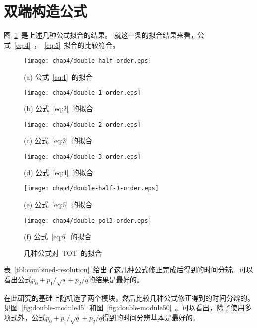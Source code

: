 \section{双端构造公式}

图~\ref{fig:single-formula}~是上述几种公式拟合的结果。
就这一条的拟合结果来看，公式~\ref{eq:4}~，~\ref{eq:5}~拟合的比较符合。

\begin{figure}[!h]
\begin{minipage}{0.5\linewidth}
  \centerline{\texttt{[image: chap4/double-half-order.eps]}}
  \centerline{(a) 公式~\ref{eq:1}~的拟合}
  \centerline{\label{fig:double-half-order}}
\end{minipage}
\hfill
\begin{minipage}{0.5\linewidth}
  \centerline{\texttt{[image: chap4/double-1-order.eps]}}
  \centerline{(b) 公式~\ref{eq:2}~的拟合}
  \centerline{\label{fig:double-1-order}}
\end{minipage}
\vfill
\begin{minipage}{0.5\linewidth}
  \centerline{\texttt{[image: chap4/double-2-order.eps]}}
  \centerline{(c) 公式~\ref{eq:3}~的拟合}
  \centerline{\label{fig:double-2-order}}
\end{minipage}
\hfill
\begin{minipage}{0.5\linewidth}
  \centerline{\texttt{[image: chap4/double-3-order.eps]}}
  \centerline{(d) 公式~\ref{eq:4}~的拟合}
  \centerline{\label{fig:double-3-order}}
\end{minipage}
\vfill
\begin{minipage}{0.5\linewidth}
  \centerline{\texttt{[image: chap4/double-half-1-order.eps]}}
  \centerline{(e) 公式~\ref{eq:5}~的拟合}
  \centerline{\label{fig:double-half-1-order}}
\end{minipage}
\hfill
\begin{minipage}{0.5\linewidth}
  \centerline{\texttt{[image: chap4/double-pol3-order.eps]}}
  \centerline{(f) 公式~\ref{eq:6}~的拟合}
  \centerline{\label{fig:double-pol3-order}}
\end{minipage}
\caption{几种公式对~TOT~的拟合}
\label{fig:single-formula}
\end{figure}

表~\ref{tbl:combined-resolution}~给出了这几种公式修正完成后得到的时间分辨。可以看出公式${p_{0}+p_{1}/\sqrt{q}+p_{2}/q}$的结果是最好的。

在此研究的基础上随机选了两个模块，然后比较几种公式修正得到的时间分辨的。见图~\ref{fig:double-module45}~和图~\ref{fig:double-module50}~。可以看出，除了使用多项式外，公式${p_{0}+p_{1}/\sqrt{q}+p_{2}/q}$得到的时间分辨基本是最好的。

